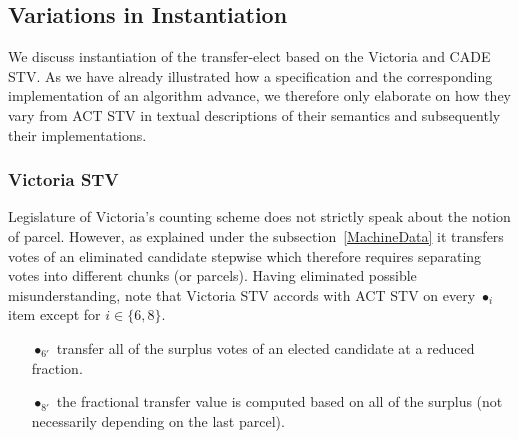 \documentclass[10pt,conference]{IEEEtran}
\begin{document}
\subsection{Variations in Instantiation}
We discuss instantiation of the transfer-elect  based on the Victoria and CADE STV. As we have already illustrated how a specification and the corresponding implementation of an algorithm advance, we therefore only elaborate on how they vary from ACT STV in textual descriptions of their semantics and subsequently their implementations. 
\subsubsection{Victoria STV}
Legislature of Victoria's counting scheme does not strictly speak about the notion of parcel. However, as explained under the subsection~\ref{MachineData} it transfers votes of an eliminated candidate stepwise which therefore requires separating votes into different chunks (or parcels). Having eliminated possible misunderstanding, note that Victoria STV accords with ACT STV  on every $\bullet_{i}$ item except for $i\in\{6,8\}$.
\begin{itemize}
\item[$\bullet_{6'}$] transfer all of the surplus votes of an elected candidate at a reduced fraction.
\item[$\bullet_{8'}$] the fractional transfer value is computed based on all of the surplus (not necessarily depending on the last parcel).
\end{itemize} 
\end{document}
